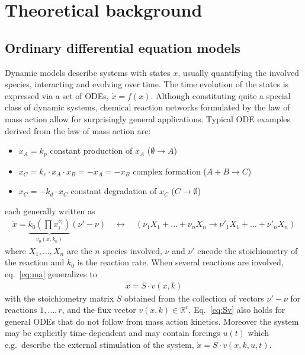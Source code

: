 \documentclass[article]{jss}
\begin{document}
\section{Theoretical background}
\label{sec:theory}

\subsection{Ordinary differential equation models}
Dynamic models describe systems with states $x$, usually quantifying the involved species, interacting and evolving over time. %
The time evolution of the states is expressed via a set of ODEs, $\dot x = f(x)$. Although constituting quite a special class of dynamic systems, chemical reaction networks formulated by the law of mass action allow for surprisingly general applications. Typical ODE examples derived from the law of mass action are:
\begin{itemize}
	\item $\dot x_A = k_p$ constant production of $x_A$ ($\emptyset \rightarrow A$)
	\item $\dot x_C = k_c \cdot x_A \cdot x_B = - \dot x_A = - \dot x_B$ complex formation ($A+B \rightarrow C$)
	\item $\dot x_C = - k_d \cdot x_C$ constant degradation of $x_C$ ($C \rightarrow \emptyset$)
\end{itemize}
each generally written as 
\begin{align}
	\dot x = \underbrace{k_0 \left(\prod x_i^{\nu_i}\right)}_{v_0(x, k_0)} (\nu' - \nu) \quad\leftrightarrow\quad (\nu_1 X_1 + \dots + \nu_n X_n \longrightarrow \nu'_1 X_1 + \dots + \nu'_n X_n)
	\label{eq:ma}
\end{align}
where $X_1, \dots, X_n$ are the $n$ species involved, $\nu$ and $\nu'$ encode the stoichiometry of the reaction and $k_0$ is the reaction rate. When several reactions are involved, eq.~\eqref{eq:ma} generalizes to 
\begin{align}
	\dot x = S\cdot v(x, k)
	\label{eq:Sv}
\end{align}
with the stoichiometry matrix $S$
obtained from the collection of vectors $\nu' - \nu$ for reactions $1, \dots, r$,
and the flux vector $v(x,k)\in\mathbb R^{r}$.
Eq.~\eqref{eq:Sv} also holds for general ODEs that do not follow from mass action kinetics. Moreover the system may be explicitly time-dependent and may contain forcings $u(t)$ which e.g.~describe the external stimulation of the system, $\dot x = S \cdot v(x,k,u,t)$. %
\end{document}
